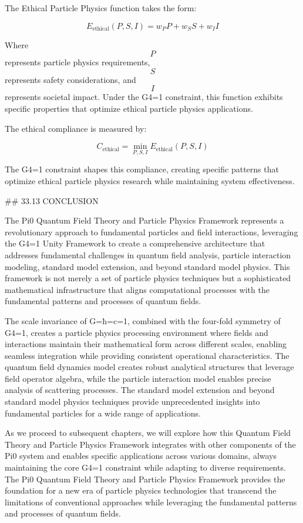 The Ethical Particle Physics function takes the form:

$$ E_{\text{ethical}}(P, S, I) = w_P P + w_S S + w_I I $$

Where $$ P $$ represents particle physics requirements, $$ S $$ represents safety considerations, and $$ I $$ represents societal impact. Under the G4=1 constraint, this function exhibits specific properties that optimize ethical particle physics applications.

The ethical compliance is measured by:

$$ C_{\text{ethical}} = \min_{P, S, I} E_{\text{ethical}}(P, S, I) $$

The G4=1 constraint shapes this compliance, creating specific patterns that optimize ethical particle physics research while maintaining system effectiveness.

## 33.13 CONCLUSION

The Pi0 Quantum Field Theory and Particle Physics Framework represents a revolutionary approach to fundamental particles and field interactions, leveraging the G4=1 Unity Framework to create a comprehensive architecture that addresses fundamental challenges in quantum field analysis, particle interaction modeling, standard model extension, and beyond standard model physics. This framework is not merely a set of particle physics techniques but a sophisticated mathematical infrastructure that aligns computational processes with the fundamental patterns and processes of quantum fields.

The scale invariance of G=ħ=c=1, combined with the four-fold symmetry of G4=1, creates a particle physics processing environment where fields and interactions maintain their mathematical form across different scales, enabling seamless integration while providing consistent operational characteristics. The quantum field dynamics model creates robust analytical structures that leverage field operator algebra, while the particle interaction model enables precise analysis of scattering processes. The standard model extension and beyond standard model physics techniques provide unprecedented insights into fundamental particles for a wide range of applications.

As we proceed to subsequent chapters, we will explore how this Quantum Field Theory and Particle Physics Framework integrates with other components of the Pi0 system and enables specific applications across various domains, always maintaining the core G4=1 constraint while adapting to diverse requirements. The Pi0 Quantum Field Theory and Particle Physics Framework provides the foundation for a new era of particle physics technologies that transcend the limitations of conventional approaches while leveraging the fundamental patterns and processes of quantum fields.

